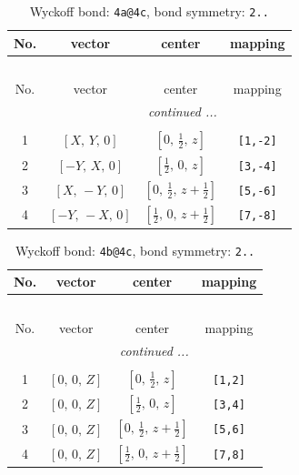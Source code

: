 \documentclass[fleqn,8pt]{jsarticle}
\begin{document}
\begin{longtable}{cccc}
\caption{Wyckoff bond: {\tt 4a@4c}, bond symmetry: {\tt 2..}}
 \\
 \hline \hline
No. & vector & center & mapping \\ \hline \endfirsthead

\multicolumn{3}{l}{\tablename\ \thetable{}} \\
 \hline \hline
No. & vector & center & mapping \\ \hline \endhead

 \hline \hline
\multicolumn{3}{r}{\footnotesize\it continued ...} \\ \endfoot

 \hline \hline
\multicolumn{3}{r}{} \\ \endlastfoot

1 & $\left[ X,\, Y,\, 0 \right]$ & $\left[ 0,\, \frac{1}{2},\, z \right]$ & {\tt [1,-2]} \\ \hline
2 & $\left[ - Y,\, X,\, 0 \right]$ & $\left[ \frac{1}{2},\, 0,\, z \right]$ & {\tt [3,-4]} \\ \hline
3 & $\left[ X,\, - Y,\, 0 \right]$ & $\left[ 0,\, \frac{1}{2},\, z + \frac{1}{2} \right]$ & {\tt [5,-6]} \\ \hline
4 & $\left[ - Y,\, - X,\, 0 \right]$ & $\left[ \frac{1}{2},\, 0,\, z + \frac{1}{2} \right]$ & {\tt [7,-8]} \\
\end{longtable}
\renewcommand{\arraystretch}{1.2}
\begin{longtable}{cccc}
\caption{Wyckoff bond: {\tt 4b@4c}, bond symmetry: {\tt 2..}}
 \\
 \hline \hline
No. & vector & center & mapping \\ \hline \endfirsthead

\multicolumn{3}{l}{\tablename\ \thetable{}} \\
 \hline \hline
No. & vector & center & mapping \\ \hline \endhead

 \hline \hline
\multicolumn{3}{r}{\footnotesize\it continued ...} \\ \endfoot

 \hline \hline
\multicolumn{3}{r}{} \\ \endlastfoot

1 & $\left[ 0,\, 0,\, Z \right]$ & $\left[ 0,\, \frac{1}{2},\, z \right]$ & {\tt [1,2]} \\ \hline
2 & $\left[ 0,\, 0,\, Z \right]$ & $\left[ \frac{1}{2},\, 0,\, z \right]$ & {\tt [3,4]} \\ \hline
3 & $\left[ 0,\, 0,\, Z \right]$ & $\left[ 0,\, \frac{1}{2},\, z + \frac{1}{2} \right]$ & {\tt [5,6]} \\ \hline
4 & $\left[ 0,\, 0,\, Z \right]$ & $\left[ \frac{1}{2},\, 0,\, z + \frac{1}{2} \right]$ & {\tt [7,8]} \\
\end{longtable}
\end{document}

